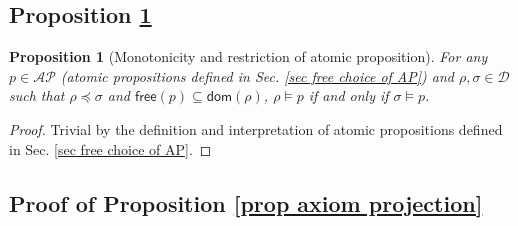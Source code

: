 \documentclass[conference,compsoc, 10pt]{IEEEtran}
\newtheorem{proposition}{Proposition}[section]
\newcommand {\cD } {{\mathcal{D}}}
\newcommand {\LTypeE }[1] {{\mathsf{dom}\!\left(#1\right)}}
\newcommand {\LTypeF }[1] {{\mathsf{free}{\left(#1\right)}}}
\newcommand {\AP} {{\mathcal{AP}}}
\begin{document}
\begin{appendices}
		\subsection{Proposition \ref{pro mon res ato prop}}
		
		\begin{proposition}[Monotonicity and restriction of atomic proposition]
			\label{pro mon res ato prop}
			For any $p\in\AP$ (atomic propositions defined in Sec. \ref{sec free choice of AP}) and $\rho,\sigma\in \cD$ such that $\rho\preceq \sigma$ and $\LTypeF{p}\subseteq\LTypeE{\rho}$, 
			$\rho\models p$ if and only if $\sigma\models p$.
		\end{proposition}
		
		\begin{proof}
			Trivial by the definition and interpretation of atomic propositions defined in Sec. \ref{sec free choice of AP}.
		\end{proof}
		
		
		\subsection{Proof of Proposition \ref{prop axiom projection}}
		

\end{appendices}
\end{document}
